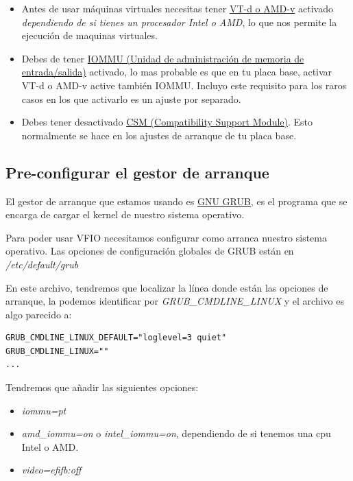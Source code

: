 \documentclass[12pt]{article}
\begin{document}
\begin{itemize}
\setlength\itemsep{-0.2em}
\item Antes de usar máquinas virtuales necesitas tener \href{https://en.wikipedia.org/wiki/X86_virtualization#Intel-VT-d}{VT-d o AMD-v} activado \emph{dependiendo de si tienes un procesador Intel o AMD}, lo que nos permite la ejecución de maquinas virtuales.
\item Debes de tener \href{https://en.wikipedia.org/wiki/Input\%E2\%80\%93output_memory_management_unit}{IOMMU (Unidad de administración de memoria de entrada/salida)} activado, lo mas probable es que en tu placa base, activar VT-d o AMD-v active también IOMMU. Incluyo este requisito para los raros casos en los que activarlo es un ajuste por separado.
\item Debes tener desactivado \href{https://en.wikipedia.org/wiki/UEFI#CSM_booting}{CSM (Compatibility Support Module)}. Esto normalmente se hace en los ajustes de arranque de tu placa base.
\end{itemize}

\subsection{Pre-configurar el gestor de arranque}

El gestor de arranque que estamos usando es \href{https://es.wikipedia.org/wiki/GNU_GRUB}{GNU GRUB}, es el programa que se encarga de cargar el kernel de nuestro sistema operativo.

Para poder usar VFIO necesitamos configurar como arranca nuestro sistema operativo. Las opciones de configuración globales de GRUB están en \emph{/etc/default/grub}

En este archivo, tendremos que localizar la línea donde están las opciones de arranque, la podemos identificar por \emph{GRUB\_CMDLINE\_LINUX} y el archivo es algo parecido a:

\begin{verbatim}
GRUB_CMDLINE_LINUX_DEFAULT="loglevel=3 quiet"
GRUB_CMDLINE_LINUX=""
...
\end{verbatim}

Tendremos que añadir las siguientes opciones:

\begin{itemize}
\setlength\itemsep{-0.2em}
\item \emph{iommu=pt}
\item \emph{amd\_iommu=on} o \emph{intel\_iommu=on}, dependiendo de si tenemos una cpu Intel o AMD.
\item \emph{video=efifb:off}
\end{itemize}
\end{document}
